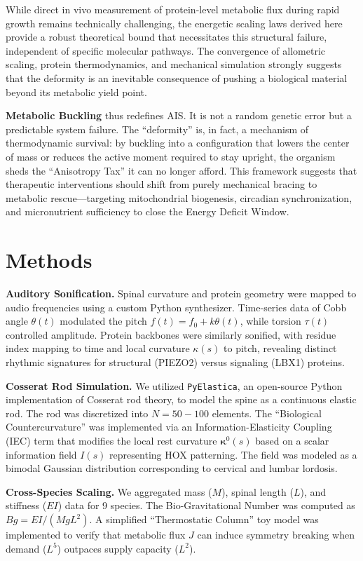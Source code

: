 \documentclass[12pt]{article}
\begin{document}
While direct in vivo measurement of protein-level metabolic flux during rapid growth remains technically challenging, the energetic scaling laws derived here provide a robust theoretical bound that necessitates this structural failure, independent of specific molecular pathways. The convergence of allometric scaling, protein thermodynamics, and mechanical simulation strongly suggests that the deformity is an inevitable consequence of pushing a biological material beyond its metabolic yield point.

\textbf{Metabolic Buckling} thus redefines AIS. It is not a random genetic error but a predictable system failure. The ``deformity'' is, in fact, a mechanism of thermodynamic survival: by buckling into a configuration that lowers the center of mass or reduces the active moment required to stay upright, the organism sheds the ``Anisotropy Tax'' it can no longer afford. This framework suggests that therapeutic interventions should shift from purely mechanical bracing to metabolic rescue—targeting mitochondrial biogenesis, circadian synchronization, and micronutrient sufficiency to close the Energy Deficit Window.

\section*{Methods}

\textbf{Auditory Sonification.} Spinal curvature and protein geometry were mapped to audio frequencies using a custom Python synthesizer. Time-series data of Cobb angle $\theta(t)$ modulated the pitch $f(t) = f_0 + k \theta(t)$, while torsion $\tau(t)$ controlled amplitude. Protein backbones were similarly sonified, with residue index mapping to time and local curvature $\kappa(s)$ to pitch, revealing distinct rhythmic signatures for structural (PIEZO2) versus signaling (LBX1) proteins.

\textbf{Cosserat Rod Simulation.} We utilized \texttt{PyElastica}\cite{tekinalp2023}, an open-source Python implementation of Cosserat rod theory, to model the spine as a continuous elastic rod. The rod was discretized into $N=50-100$ elements. The ``Biological Countercurvature'' was implemented via an Information-Elasticity Coupling (IEC) term that modifies the local rest curvature $\bm{\kappa}^0(s)$ based on a scalar information field $I(s)$ representing HOX patterning. The field was modeled as a bimodal Gaussian distribution corresponding to cervical and lumbar lordosis.

\textbf{Cross-Species Scaling.} We aggregated mass ($M$), spinal length ($L$), and stiffness ($EI$) data for 9 species. The Bio-Gravitational Number was computed as $Bg = EI / (M g L^2)$. A simplified ``Thermostatic Column'' toy model was implemented to verify that metabolic flux $J$ can induce symmetry breaking when demand ($L^5$) outpaces supply capacity ($L^2$).
\end{document}
